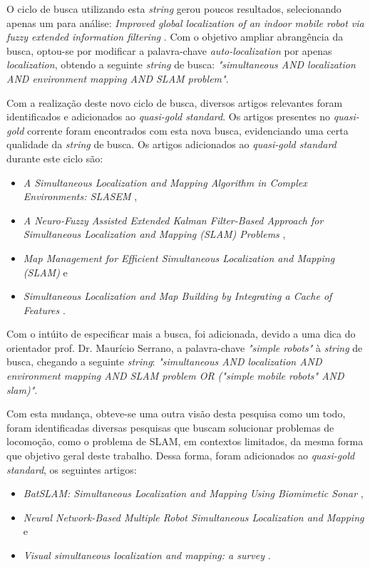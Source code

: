 		O ciclo de busca utilizando esta \textit{string} gerou poucos resultados, selecionando apenas um para análise: \textit{Improved global localization of an indoor mobile robot via fuzzy extended information filtering} \cite{ROB:1764504}. Com o objetivo ampliar abrangência da busca, optou-se por modificar a palavra-chave \textit{auto-localization} por apenas \textit{localization}, obtendo a seguinte \textit{string} de busca: \textit{"simultaneous AND localization AND environment mapping AND SLAM problem"}.

		Com a realização deste novo ciclo de busca, diversos artigos relevantes foram identificados e adicionados ao \textit{quasi-gold standard}. Os artigos presentes no \textit{quasi-gold} corrente foram encontrados com esta nova busca, evidenciando uma certa qualidade da \textit{string} de busca. Os artigos adicionados ao \textit{quasi-gold standard} durante este ciclo são:

		\begin{itemize}
			\item \textit{A Simultaneous Localization and Mapping Algorithm in Complex Environments: SLASEM} \cite{slasem},
			\item \textit{A Neuro-Fuzzy Assisted Extended Kalman Filter-Based Approach for Simultaneous Localization  and  Mapping (SLAM) Problems} \cite{neurofuzzi},
			\item \textit{Map Management for Efficient Simultaneous Localization and Mapping (SLAM)} \cite{mapManagement} e
			\item \textit{Simultaneous Localization and Map Building by Integrating a Cache of Features} \cite{integratingCacheFeat}.
		\end{itemize}

		Com o intúito de especificar mais a busca, foi adicionada, devido a uma dica do orientador prof. Dr. Maurício Serrano, a palavra-chave \textit{"simple robots"} à \textit{string} de busca, chegando a seguinte \textit{string}: \textit{"simultaneous AND localization AND environment mapping AND SLAM problem OR ("simple mobile robots" AND slam)"}.

		Com esta mudança, obteve-se uma outra visão desta pesquisa como um todo, foram identificadas diversas pesquisas que buscam solucionar problemas de locomoção, como o problema de SLAM, em contextos limitados, da mesma forma que objetivo geral deste trabalho. Dessa forma, foram adicionados ao \textit{quasi-gold standard}, os seguintes artigos:

		\begin{itemize}
			\item \textit{BatSLAM: Simultaneous Localization and Mapping Using Biomimetic Sonar} \cite{batslam},
			\item \textit{Neural Network-Based Multiple Robot Simultaneous Localization and Mapping} \cite{neuralNetwork} e
			\item \textit{Visual simultaneous localization and mapping: a survey} \cite{surveyLocalization}.
		\end{itemize}

